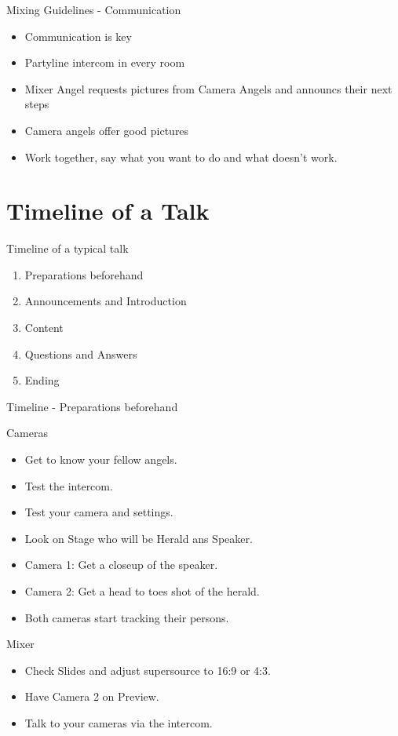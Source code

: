 \documentclass[aspectratio=169]{beamer}
\begin{document}
\begin{frame}{Mixing Guidelines - Communication}
	\begin{itemize}
		\item Communication is key
		\item Partyline intercom in every room
		\item Mixer Angel requests pictures from Camera Angels and announcs their next steps
		\item Camera angels offer good pictures
		\item Work together, say what you want to do and what doesn't work.
	\end{itemize}
\end{frame}

\section{Timeline of a Talk}

\begin{frame}{Timeline of a typical talk}
	\begin{enumerate}
		\item Preparations beforehand
		\item Announcements and Introduction
		\item Content
		\item Questions and Answers
		\item Ending
	\end{enumerate}
\end{frame}

\begin{frame}{Timeline - Preparations beforehand}
	\begin{block}{Cameras}
		\begin{itemize}
			\item Get to know your fellow angels.
			\item Test the intercom.
			\item Test your camera and settings.
			\item Look on Stage who will be Herald ans Speaker.
			\item Camera 1: Get a closeup of the speaker.
			\item Camera 2: Get a head to toes shot of the herald.
			\item Both cameras start tracking their persons.
		\end{itemize}
	\end{block}
	\begin{block}{Mixer}
		\begin{itemize}
			\item Check Slides and adjust supersource to 16:9 or 4:3.
			\item Have Camera 2 on Preview.
			\item Talk to your cameras via the intercom.
		\end{itemize}
	\end{block}
\end{frame}
\end{document}
